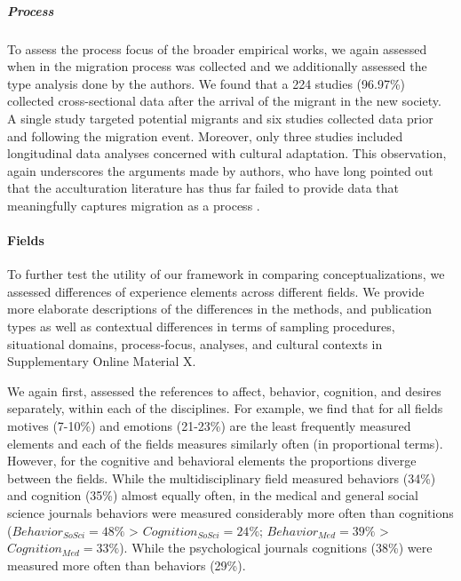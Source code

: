 \documentclass[man, 12pt, a4paper]{apa7}
\begin{document}
\subparagraph{Process}
To assess the process focus of the broader empirical works, we again assessed when in the migration process was collected and we additionally assessed the type analysis done by the authors. We found that a 224 studies (96.97\%) collected cross-sectional data after the arrival of the migrant in the new society. A single study targeted potential migrants and six studies collected data prior and following the migration event. Moreover, only three studies included longitudinal data analyses concerned with cultural adaptation. This observation, again underscores the arguments made by authors, who have long pointed out that the acculturation literature has thus far failed to provide data that meaningfully captures migration as a process \citep[e.g.,][]{Brown2011, Ward2019}.

\paragraph{Fields}
To further test the utility of our framework in comparing conceptualizations, we assessed differences of experience elements across different fields. We provide more elaborate descriptions of the differences in the methods, and publication types as well as contextual differences in terms of sampling procedures, situational domains, process-focus, analyses, and cultural contexts in Supplementary Online Material X. 

We again first, assessed the references to affect, behavior, cognition, and desires separately, within each of the disciplines. For example, we find that for all fields motives (7-10\%) and emotions (21-23\%) are the least frequently measured elements and each of the fields measures similarly often (in proportional terms). However, for the cognitive and behavioral elements the proportions diverge between the fields. While the multidisciplinary field measured behaviors (34\%) and cognition (35\%) almost equally often, in the medical and general social science journals behaviors were measured considerably more often than cognitions ($Behavior_{SoSci} = 48\%$ > $Cognition_{SoSci} = 24\%$; $Behavior_{Med} = 39\%$ > $Cognition_{Med} = 33\%$). While the psychological journals cognitions (38\%) were measured more often than behaviors (29\%). 
\end{document}
